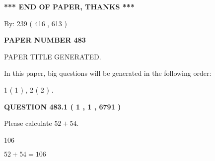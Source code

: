 \documentclass[12pt]{article}
\begin{document}
   
\vspace{1.0in} 
{\textbf{\large{ *** END OF PAPER, THANKS *** }}} 
   
   
\hspace{1.0in} By: 
 239 ( 416 ,  613 )
   
   
   
   
\newpage 
\setcounter{page}{ 
   483001 } 
   
   
   
   
 {\textbf{ \Large{ PAPER NUMBER  483  }}}
   
   
\vspace{0.2in}
   
   
   
   
   
   
   
   
 \vspace{0.2in}
 
 
 
 
   
   
 PAPER TITLE GENERATED.
   
   
   
\vspace{0.2in}
   
In this paper, big questions will be generated in the following order: 
   
   
   1 ( 1 )
 ,
   2 ( 2 )
 .
  
\vspace{0.2in}
  
{\textbf{\Large{QUESTION
483.1 
 ( 1 , 1 , 6791 )
}}}
  
  
 
Please calculate $ %
52 +  %
54 $.
 
 
 
\noindent{}
 
 

106
 
 
\noindent{}
 
 

 
 
 
\noindent{}
 
 

$ %
52 +  %
54=   %
106$
 
\end{document}
